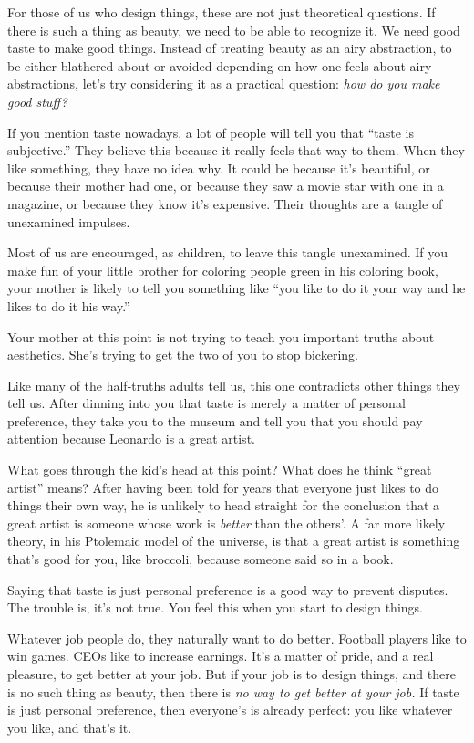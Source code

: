 \documentclass[12pt]{book}
\begin{document}
For those of us who design things, these are not just theoretical
questions. If there is such a thing as beauty, we need to be able to
recognize it. We need good taste to make good things. Instead of
treating beauty as an airy abstraction, to be either blathered about or
avoided depending on how one feels about airy abstractions, let's try
considering it as a practical question: \emph{how do you make good
stuff?}

If you mention taste nowadays, a lot of people will tell you that
``taste is subjective.'' They believe this because it really feels that
way to them. When they like something, they have no idea why. It could
be because it's beautiful, or because their mother had one, or because
they saw a movie star with one in a magazine, or because they know it's
expensive. Their thoughts are a tangle of unexamined impulses.

Most of us are encouraged, as children, to leave this tangle unexamined.
If you make fun of your little brother for coloring people green in his
coloring book, your mother is likely to tell you something like ``you
like to do it your way and he likes to do it his way.''

Your mother at this point is not trying to teach you important truths
about aesthetics. She's trying to get the two of you to stop bickering.

Like many of the half-truths adults tell us, this one contradicts other
things they tell us. After dinning into you that taste is merely a
matter of personal preference, they take you to the museum and tell you
that you should pay attention because Leonardo is a great artist.

What goes through the kid's head at this point? What does he think
``great artist'' means? After having been told for years that everyone
just likes to do things their own way, he is unlikely to head straight
for the conclusion that a great artist is someone whose work is
\emph{better} than the others'. A far more likely theory, in his
Ptolemaic model of the universe, is that a great artist is something
that's good for you, like broccoli, because someone said so in a book.

Saying that taste is just personal preference is a good way to prevent
disputes. The trouble is, it's not true. You feel this when you start to
design things.

Whatever job people do, they naturally want to do better. Football
players like to win games. CEOs like to increase earnings. It's a matter
of pride, and a real pleasure, to get better at your job. But if your
job is to design things, and there is no such thing as beauty, then
there is \emph{no way to get better at your job.} If taste is just
personal preference, then everyone's is already perfect: you like
whatever you like, and that's it.
\end{document}
